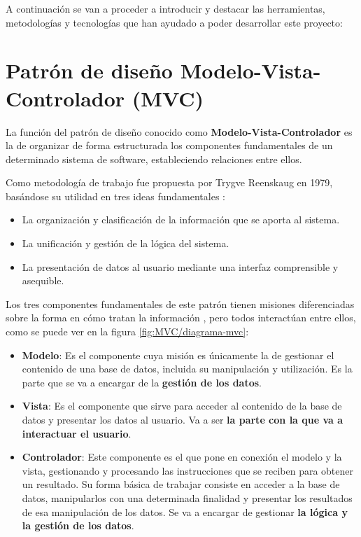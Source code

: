 
A continuación se van a proceder a introducir y destacar las herramientas, metodologías y tecnologías que han ayudado a poder desarrollar este proyecto:

\section{Patrón de diseño Modelo-Vista-Controlador (MVC)}

La función del patrón de diseño conocido como \textbf{Modelo-Vista-Controlador} es la de organizar de forma estructurada los componentes fundamentales de un determinado sistema de software, estableciendo relaciones entre ellos.

Como metodología de trabajo fue propuesta por Trygve Reenskaug en 1979, basándose su utilidad en tres ideas fundamentales \cite{campusmvp:mvc}:

\begin{itemize}
\item La organización y clasificación de la información que se aporta al sistema.
\item La unificación y gestión de la lógica del sistema.
\item La presentación de datos al usuario mediante una interfaz comprensible y asequible.
\end{itemize}

Los tres componentes fundamentales de este patrón tienen misiones diferenciadas sobre la forma en cómo tratan la información \cite{easyappcode:mvc}, pero todos interactúan entre ellos, como se puede ver en la figura \ref{fig:MVC/diagrama-mvc}: 

\begin{itemize}
\item \textbf{Modelo}: Es el componente cuya misión es únicamente la de gestionar el contenido de una base de datos, incluida su manipulación y utilización. Es la parte que se va a encargar de la \textbf{gestión de los datos}.
\item \textbf{Vista}: Es el componente que sirve para acceder al contenido de la base de datos y presentar los datos al usuario. Va a ser \textbf{la parte con la que va a interactuar el usuario}.
\item \textbf{Controlador}: Este componente es el que pone en conexión el modelo y la vista, gestionando y procesando las instrucciones que se reciben para obtener un resultado. Su forma básica de trabajar consiste en acceder a la base de datos, manipularlos con una determinada finalidad y presentar los resultados de esa manipulación de los datos. Se va a encargar de gestionar \textbf{la lógica y la gestión de los datos}.
\end{itemize}

